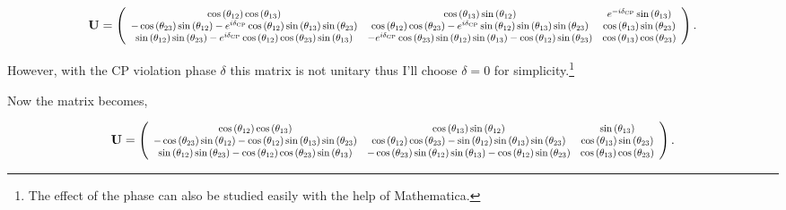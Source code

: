 \documentclass{tufte-handout}
\begin{document}
\newcommand\scalemath[2]{\scalebox{#1}{\mbox{\ensuremath{\displaystyle #2}}}}

\begin{equation*}
\mathbf{U} = \left(
\scalemath{0.8}{
\begin{array}{ccc}
 \cos \left(\theta _{12}\right) \cos \left(\theta _{13}\right) & \cos \left(\theta _{13}\right) \sin \left(\theta _{12}\right) & e^{-i \delta _{\text{CP}}} \sin \left(\theta _{13}\right) \\
 -\cos \left(\theta _{23}\right) \sin \left(\theta _{12}\right)-e^{i \delta _{\text{CP}}} \cos \left(\theta _{12}\right) \sin \left(\theta _{13}\right) \sin \left(\theta _{23}\right) & \cos \left(\theta _{12}\right) \cos \left(\theta _{23}\right)-e^{i \delta _{\text{CP}}} \sin \left(\theta _{12}\right) \sin \left(\theta _{13}\right) \sin \left(\theta _{23}\right) & \cos \left(\theta _{13}\right) \sin \left(\theta _{23}\right) \\
 \sin \left(\theta _{12}\right) \sin \left(\theta _{23}\right)-e^{i \delta _{\text{CP}}} \cos \left(\theta _{12}\right) \cos \left(\theta _{23}\right) \sin \left(\theta _{13}\right) & -e^{i \delta _{\text{CP}}} \cos \left(\theta _{23}\right) \sin \left(\theta _{12}\right) \sin \left(\theta _{13}\right)-\cos \left(\theta _{12}\right) \sin \left(\theta _{23}\right) & \cos \left(\theta _{13}\right) \cos \left(\theta _{23}\right) \\
\end{array}
}
\right).
\end{equation*}


However, with the CP violation phase $\delta$ this matrix is not unitary thus I'll choose $\delta=0$ for simplicity.\footnote{The effect of the phase can also be studied easily with the help of Mathematica.}

Now the matrix becomes,


\begin{equation*}
\mathbf{U} = \left(
\scalemath{0.8}{
\begin{array}{ccc}
 \cos \left(\theta _{12}\right) \cos \left(\theta _{13}\right) & \cos \left(\theta _{13}\right) \sin \left(\theta _{12}\right) & \sin \left(\theta _{13}\right) \\
 -\cos \left(\theta _{23}\right) \sin \left(\theta _{12}\right)-\cos \left(\theta _{12}\right) \sin \left(\theta _{13}\right) \sin \left(\theta _{23}\right) & \cos \left(\theta _{12}\right) \cos \left(\theta _{23}\right)-\sin \left(\theta _{12}\right) \sin \left(\theta _{13}\right) \sin \left(\theta _{23}\right) & \cos \left(\theta _{13}\right) \sin \left(\theta _{23}\right) \\
 \sin \left(\theta _{12}\right) \sin \left(\theta _{23}\right)-\cos \left(\theta _{12}\right) \cos \left(\theta _{23}\right) \sin \left(\theta _{13}\right) & -\cos \left(\theta _{23}\right) \sin \left(\theta _{12}\right) \sin \left(\theta _{13}\right)-\cos \left(\theta _{12}\right) \sin \left(\theta _{23}\right) & \cos \left(\theta _{13}\right) \cos \left(\theta _{23}\right) \\
\end{array}
}
\right).
\end{equation*}
\end{document}

